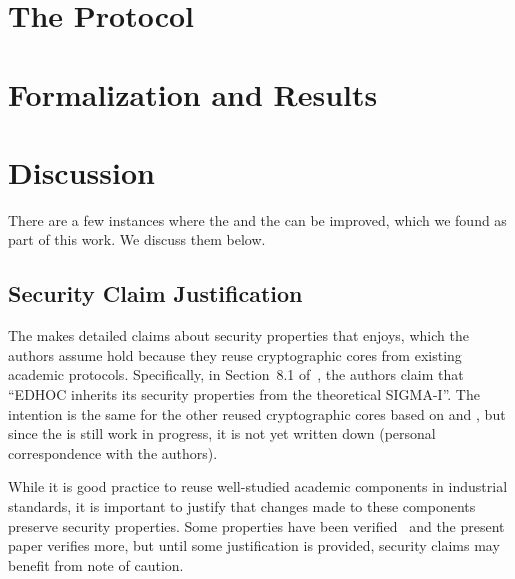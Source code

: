 \documentclass[runningheads, envcountsame, a4paper, draft, x11names]{llncs}
\begin{document}
\section{The \mEdhoc{} Protocol}
\label{sec:edhoc}


\section{Formalization and Results}
\label{sec:formalization}


\section{Discussion}
\label{sec:discussion}
There are a few instances where the \mEdhoc{} and the \mSpec{} can be improved,
which we found as part of this work. We discuss them below.
%

\subsection{Security Claim Justification}
\label{sec:securityClaims}
The \mSpec{} makes detailed claims about security properties that \mEdhoc{}
enjoys, which the authors assume hold because they reuse cryptographic cores
from existing academic protocols.
%
Specifically, in Section~8.1 of~\cite{selander-lake-edhoc-01}, the authors
claim that ``EDHOC inherits its security properties from the theoretical
SIGMA-I''.
%
The intention is the same for the other reused cryptographic
cores based on \mOptls{} and \mNoise{}, but since the \mSpec{} is still work in
progress, it is not yet written down (personal correspondence with the authors).
%

While it is good practice to reuse well-studied academic components in
industrial standards, it is important to justify that changes made to these
components preserve security properties.
%
Some properties have been verified~\cite{DBLP:conf/secsr/BruniJPS18} and the
present paper verifies more, but until some justification is provided, security
claims may benefit from note of caution.
\end{document}
